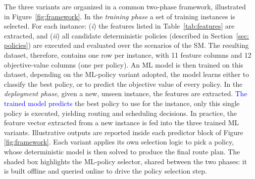 \documentclass[authoryear,preprint,12pt]{elsarticle}
\newcommand{\rev}[1]{\textcolor{blue}{{#1}}}
\begin{document}
The three variants are organized in a common two-phase framework, illustrated in Figure~\ref{fig:framework}. 
%
In the \textit{training phase} a set of training instances is selected. For each instance: (\textit{i}) the features listed in Table~\ref{tab:features} are extracted, and (\textit{ii}) all candidate deterministic policies (described in Section~\ref{sec: policies}) are executed and evaluated over the scenarios of the SM. The resulting dataset, therefore, contains one row per instance, with 11 feature columns and 12 objective-value columns (one per policy). An ML model is then trained on this dataset, depending on the ML-policy variant adopted, the model learns either to classify the best policy, or to predict the objective value of every policy.
In the \textit{deployment phase}, given a new, unseen instance, the features are extracted. \rev{The trained model predicts} the best policy to use for the instance, only this single policy is executed, yielding routing and scheduling decisions. In practice, the feature vector extracted from a new instance is fed into the three trained ML variants. Illustrative outputs are reported inside each predictor block of Figure \ref{fig:framework}. Each variant applies its own selection logic to pick a policy, whose deterministic model is then solved to produce the final route plan. The shaded box highlights the ML-policy selector, shared between the two phases: it is built offline and queried online to drive the policy selection step.
\end{document}
